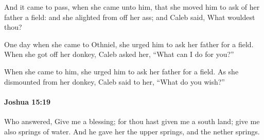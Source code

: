 			\begin{versebox}
					\item[BHS] 
					\item[ASV] And it came to pass, when she came unto him, that she moved him to ask of her father a field: and she alighted from off her ass; and Caleb said, What wouldest thou?
					\item[NIV] One day when she came to Othniel, she urged him to ask her father for a field. When she got off her donkey, Caleb asked her, “What can I do for you?”
					\item[NRSV] When she came to him, she urged him to ask her father for a field. As she dismounted from her donkey, Caleb said to her, “What do you wish?”
			\end{versebox}

		\paragraph{Joshua 15:19} %
			\label{JOSHUA-15-19}

			Who answered, Give me a blessing; for thou hast given me a south land; give me also springs of water. And he gave her the upper springs, and the nether springs.

